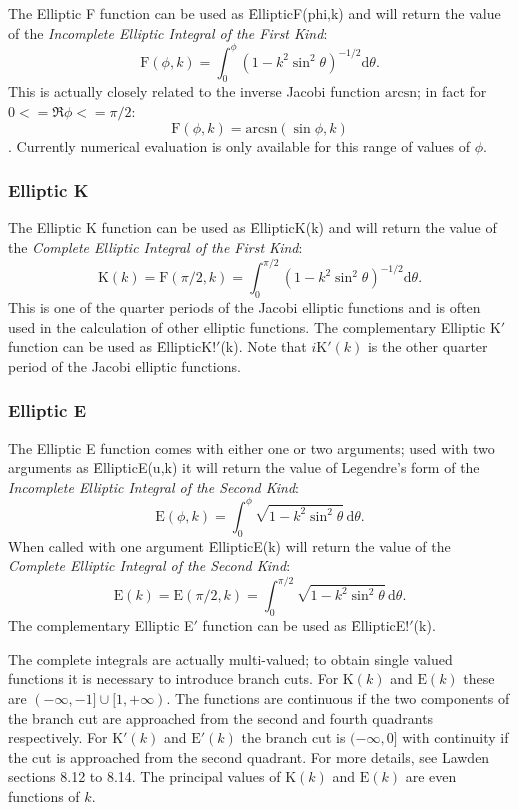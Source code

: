 The Elliptic F function can be used as \f{EllipticF(phi,k)} and
will return the value of the \emph{Incomplete Elliptic Integral of the
First Kind}:
\[\mathrm{F}(\phi, k)=\int_0^\phi(1-k^2 \sin^2 \theta)^{-1/2} \mathrm{d}\theta.\]
This is actually closely related to the inverse Jacobi function
$\mathrm{arcsn}$; in fact for $0 <= \Re \phi <=\pi/2$:
\[ \mathrm{F}(\phi, k) = \mathrm{arcsn}(\sin \phi, k) \].
Currently numerical evaluation is only available for this range of values
of $\phi$.
  
\subsubsection{Elliptic K}
\hypertarget{operator:ELLIPTICK}{}
\hypertarget{operator:ELLIPTICK'}{}

The Elliptic K function can be used as \f{EllipticK(k)} and will
return the value of the \emph{Complete Elliptic Integral of the
First Kind}:
\[\mathrm{K}(k)=\mathrm{F}(\pi/2, k) =\int_0^{\pi/2}(1-k^2 \sin^2 \theta)^{-1/2}\mathrm{d}\theta.\]
This is one of the quarter periods of the Jacobi elliptic
functions and is often used in the calculation of other elliptic functions.
The complementary Elliptic K$'$ function can be used as \f{EllipticK!$'$(k)}.
Note that $i\mathrm{K}'(k)$ is the other quarter period of the Jacobi
elliptic functions.  

\subsubsection{Elliptic E}
\hypertarget{operator:ELLIPTICE}{}
\hypertarget{operator:ELLIPTICE'}{}

The Elliptic E function comes with either one or two arguments;
used with two arguments as \f{EllipticE(u,k)}
it will return the value of Legendre's form of
the \emph{Incomplete Elliptic Integral of the Second Kind}:
\[\mathrm{E}(\phi, k)=\int_0^\phi \sqrt{1-k^2 \sin^2 \theta} \,\mathrm{d}\theta.\]
 When called with one argument \f{EllipticE(k)} will return the value of the
\emph{Complete Elliptic Integral of the Second Kind}:
\[\mathrm{E}(k)=\mathrm{E}(\pi/2, k) =
\int_0^{\pi/2} \sqrt{1-k^2 \sin^2 \theta} \,\mathrm{d}\theta.\]
The complementary Elliptic E$'$ function can be used as \f{EllipticE!$'$(k)}.

The complete integrals are actually multi-valued; to obtain single valued
functions it is necessary to introduce branch cuts. For $\mathrm{K}(k)$ and
$\mathrm{E}(k)$  these are $(-\infty, -1] \cup [1, +\infty)$.
The functions are continuous if the two components of the branch cut are
approached from the second and fourth quadrants respectively.
For $\mathrm{K}'(k)$ and $\mathrm{E}'(k)$ the branch cut is
$(-\infty, 0]$ with continuity if the cut is approached from the second
quadrant. For more details, see Lawden \cite{Lawden:89} sections 8.12 to 8.14.
The principal values of $\mathrm{K}(k)$ and $\mathrm{E}(k)$ are even functions
of $k$.

